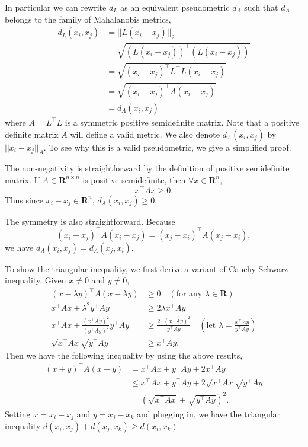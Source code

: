 \documentclass[12pt]{article}
\newcommand\R{\mathbf{R}}
\newcommand\T{^\top}
\newenvironment{proof}{{\bf Proof:}}{\hfill\rule{2mm}{2mm}}
\begin{document}
In particular we can rewrite $d_L$ as an equivalent pseudometric $d_A$ such that $d_A$ belongs to the family of Mahalanobis metrics,
\begin{align*}
d_L(x_i,x_j) & = ||L(x_i-x_j)||_2 \\
& = \sqrt{(L(x_i-x_j))\T(L(x_i-x_j))} \\
& = \sqrt{(x_i-x_j)\T L\T L(x_i-x_j)} \\
& = \sqrt{(x_i-x_j)\T A(x_i-x_j)} \\
& = d_A(x_i, x_j)
\end{align*}
where $A=L\T L$ is a symmetric positive semidefinite matrix. Note that  a positive definite matrix $A$ will define a valid metric.  We also denote $d_A(x_i, x_j)$ by $||x_i-x_j||_A$. To see why this is a valid pseudometric, we give a simplified proof.

\begin{proof}
The non-negativity is straightforward by the definition of positive semidefinite matrix. If $A\in\R^{n\times n}$ is positive semidefinite, then $\forall x\in \R^n$, \[x\T Ax\geq 0.\] Thus since $x_i-x_j\in \R^n$, $d_A(x_i,x_j)\geq 0$.

The symmetry is also straightforward. Because
\[(x_i-x_j)\T A(x_i-x_j) = (x_j-x_i)\T A(x_j-x_i),\] we have $d_A(x_i,x_j)=d_A(x_j,x_i)$.

To show the triangular inequality, we first derive a variant of Cauchy-Schwarz inequality. Given $x\neq 0$ and $y\neq 0$,
\begin{align*}
(x-\lambda y)\T A (x-\lambda y) &\geq 0 \quad(\text{for any $\lambda\in\R$})\\
x\T Ax + \lambda^2y\T Ay &\geq 2\lambda x\T Ay \\
x\T Ax + \frac{(x\T Ay)^2}{(y\T Ay)^2} y\T Ay &\geq \frac{2\cdot (x\T Ay)^2}{y\T Ay}\quad(\text{let $\lambda=\frac{x\T Ay}{y\T Ay}$}) \\
\sqrt{x\T Ax}\sqrt{y\T Ay}&\geq x\T Ay.
\end{align*}
Then we have the following inequality by using the above results,
\begin{align*}
(x+y)\T A(x+y)  & = x\T Ax + y\T Ay + 2x\T Ay \\
&\leq x\T Ax + y\T Ay + 2\sqrt{x\T Ax}\sqrt{y\T Ay} \\
& = (\sqrt{x\T Ax} + \sqrt{y\T Ay})^2.
\end{align*}
Setting $x = x_i-x_j$ and $y = x_j-x_k$ and plugging in, we have the triangular inequality $d(x_i,x_j) + d(x_j,x_k)\geq d(x_i,x_k)$.
\end{proof}
\end{document}
